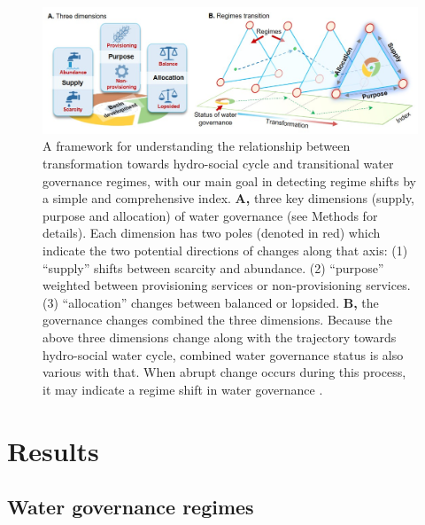 \documentclass[9pt, twocolumn, twoside, lineno]{pnas-new}
\begin{document}
\begin{figure}%
	\centering
	\includegraphics[width=0.8\linewidth]{../../figures/main/framework.jpg}
	\caption{
		A framework for understanding the relationship between transformation towards hydro-social cycle and transitional water governance regimes, with our main goal in detecting regime shifts by a simple and comprehensive index.
		\textbf{A,} three key dimensions (supply, purpose and allocation) of water governance (see Methods for details). Each dimension has two poles (denoted in red) which indicate the two potential directions of changes along that axis: (1) ``supply'' shifts between scarcity and abundance. (2) ``purpose'' weighted between provisioning services or non-provisioning services. (3) ``allocation'' changes between balanced or lopsided. 
		\textbf{B,} the governance changes combined the three dimensions. Because the above three dimensions change along with the trajectory towards hydro-social water cycle, combined water governance status is also various with that. When abrupt change occurs during this process, it may indicate a regime shift in water governance
		\cite{steffen2018,abbott2019,levia2020}.
	}
	\label{fig:framework}
\end{figure}


\section*{Results}
\subsection*{Water governance regimes}
\end{document}
